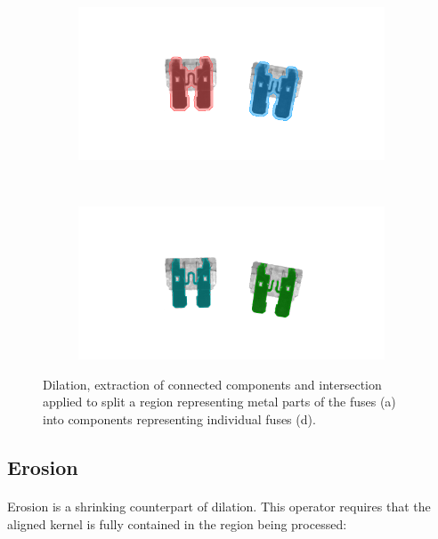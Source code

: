 \begin{figure}
    \begin{subfigure}[b]{\basicWidth}
            \centering
            \includegraphics[width=\linewidth]{BlobAnalysis/img/fuses_dilated_blobs}
            \caption{}
    \end{subfigure}%
    ~
    \begin{subfigure}[b]{\basicWidth}
            \centering
            \includegraphics[width=\linewidth]{BlobAnalysis/img/fuses_components}
            \caption{}
    \end{subfigure}
    
    \caption{Dilation, extraction of connected components and intersection applied to split a region representing metal parts of the fuses (a) into components representing individual fuses (d).}
    \label{fig:DilationAppliedToFuses}
\end{figure}

\subsection{Erosion}

\paragraph*{}
Erosion is a shrinking counterpart of dilation. This operator requires that the aligned kernel is fully contained in the region being processed:

